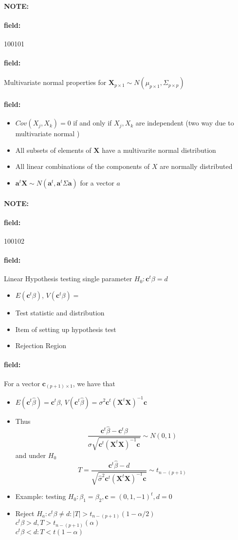\documentclass[12pt]{article}
\newenvironment{note}{\paragraph{NOTE:}}{}
\newenvironment{field}{\paragraph{field:}}{}
\begin{document}
\begin{note} \begin{field} \tiny 100101 \end{field}
 \begin{field}
  Multivariate normal properties for $\mathbf{X}_{p \times 1} \sim N(\mu_{p\times 1}, \Sigma_{p \times p})$
 \end{field}
 \begin{field}
  \begin{itemize}
   \item $Cov(X_j,X_k) = 0$ if and only if $X_j,X_k$ are independent (two way due to multivariate normal )
   \item All subsets of elements of $\mathbf{X}$ have a multivarite normal distribution
   \item All linear combinations of the components of $X$ are normally distributed
   \item $\mathbf{a}^t \mathbf{X} \sim N(\mathbf{a}^t, \mathbf{a}^t \Sigma \mathbf{a})$ for a vector $a$
  \end{itemize}
 \end{field}
\end{note}


\begin{note} \begin{field} \tiny 100102 \end{field}
 \begin{field}
  Linear Hypothesis testing single parameter $H_0: \mathbf{c}^t \beta = d$
  \begin{itemize}
    \item $E(\mathbf{c}^t \beta)$, $V(\mathbf{c}^t \beta)= $
    \item Test statistic and distribution
    \item Item of setting up hypothesis test
    \item Rejection Region
  \end{itemize}
 \end{field}
 \begin{field}
  For a vector $\mathbf{c}_{(p+1)\times 1}$, we have that
  \begin{itemize}
   \item $E(\textbf{c}^t\hat{\beta}) = \mathbf{c}^t \beta$, $V(\mathbf{c}^t \hat{\beta}) = \sigma^2 \mathbf{c}^t (\mathbf{X}^t \mathbf{X})^{-1} \mathbf{c}$
   \item Thus $$ \frac{\mathbf{c}^t \hat{\beta} - \mathbf{c}^t \beta }{\sigma \sqrt{\mathbf{c}^t(\mathbf{X}^t \mathbf{X})^{-1} \mathbf{c}}} \sim N(0,1)$$ and under $H_0$
         $$ T = \frac{\mathbf{c}^t \hat{\beta} - d}{ \sqrt{\hat{\sigma}^2\mathbf{c}^t(\mathbf{X}^t \mathbf{X})^{-1} \mathbf{c}}} \sim t_{n - (p+1)}$$
   \item Example: testing $H_0: \beta_1 = \beta_2, \mathbf{c} = (0,1,-1)^t, d = 0$
   \item Reject $H_a: c^t \beta \neq d:  |T| > t_{n - (p+1)}(1-\alpha/2)$\\ $c^t \beta > d, T > t_{n-(p+1)}(\alpha)$\\ $c^t\beta < d: T < t(1 - \alpha)$
  \end{itemize}
 \end{field}
\end{note}
\end{document}
